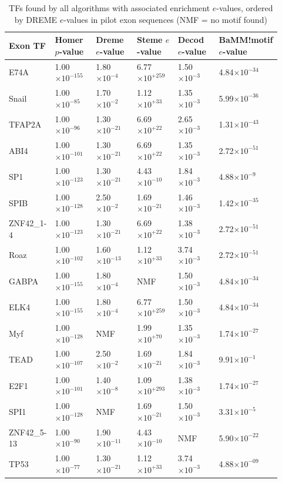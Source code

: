 \documentclass[12pt]{article}
\begin{document}
\begin{table}[!ht]
\centering
\caption{TFs found by all algorithms with associated enrichment $e$-values, ordered by DREME $e$-values in pilot exon sequences (NMF = no motif found)}\label{motif_evalue_summary_exons}
\begin{tabular}{p{0.15\linewidth}p{0.15\linewidth}p{0.15\linewidth}p{0.15\linewidth}p{0.15\linewidth}p{0.17\linewidth}}
\toprule[0.2em]
Exon TF & Homer $p$-value & Dreme $e$-value & Steme $e$-value & Decod $e$-value & BaMM!motif $e$-value\\ 
\midrule[0.1em]
E74A      	&1.00$\times10^{-155}$	&1.80$\times10^{-4}$	&6.77$\times10^{+259}$	&1.50$\times10^{-3}$	&4.84$\times10^{-34}$\\
Snail      	&1.00$\times10^{-85}$	&1.70$\times10^{-2}$	&1.12$\times10^{+33}$	&1.35$\times10^{-3}$	&5.99$\times10^{-36}$\\
TFAP2A	&1.00$\times10^{-96}$	&1.30$\times10^{-21}$	&6.69$\times10^{+22}$	&2.65$\times10^{-3}$	&1.31$\times10^{-43}$\\
ABI4		&1.00$\times10^{-101}$	&1.30$\times10^{-21}$	&6.69$\times10^{+22}$	&1.35$\times10^{-3}$	&2.72$\times10^{-51}$\\
SP1		&1.00$\times10^{-123}$	&1.30$\times10^{-21}$	&4.43$\times10^{-10}$	&1.84$\times10^{-3}$	&4.88$\times10^{-9}$\\
SPIB		&1.00$\times10^{-128}$	&2.50$\times10^{-2}$	&1.69$\times10^{-21}$	&1.46$\times10^{-3}$	&1.42$\times10^{-35}$\\
ZNF42{\_}1-4&1.00$\times10^{-123}$	&1.30$\times10^{-21}$	&6.69$\times10^{+22}$	&1.38$\times10^{-3}$	&2.72$\times10^{-51}$\\
Roaz		&1.00$\times10^{-102}$	&1.60$\times10^{-13}$	&1.12$\times10^{+33}$	&3.74$\times10^{-3}$	&2.72$\times10^{-51}$\\
GABPA	&1.00$\times10^{-155}$	&1.80$\times10^{-4}$	&NMF					&1.50$\times10^{-3}$	&4.84$\times10^{-34}$\\
ELK4	&1.00$\times10^{-155}$	&1.80$\times10^{-4}$	&6.77$\times10^{+259}$	&1.50$\times10^{-3}$	&4.84$\times10^{-34}$\\
Myf		&1.00$\times10^{-128}$	&NMF				&1.99$\times10^{+70}$	&1.35$\times10^{-3}$	&1.74$\times10^{-27}$\\
TEAD	&1.00$\times10^{-107}$	&2.50$\times10^{-2}$	&1.69$\times10^{-21}$	&1.84$\times10^{-3}$	&9.91$\times10^{-1}$\\
E2F1	&1.00$\times10^{-101}$	&1.40$\times10^{-8}$	&1.09$\times10^{+293}$	&1.38$\times10^{-3}$	&1.74$\times10^{-27}$\\
SPI1		&1.00$\times10^{-128}$	&NMF				&1.69$\times10^{-21}$	&1.50$\times10^{-3}$	&3.31$\times10^{-5}$\\
ZNF42{\_}5-13&1.00$\times10^{-90}$&1.90$\times10^{-11}$	&4.43$\times10^{-10}$	&NMF				&5.90$\times10^{-22}$\\
TP53	&1.00$\times10^{-77}$	&1.30$\times10^{-21}$	&1.12$\times10^{+33}$	&3.74$\times10^{-3}$	&4.88$\times10^{-09}$\\
\bottomrule[0.2em]
\end{tabular}
\end{table}
\end{document}
